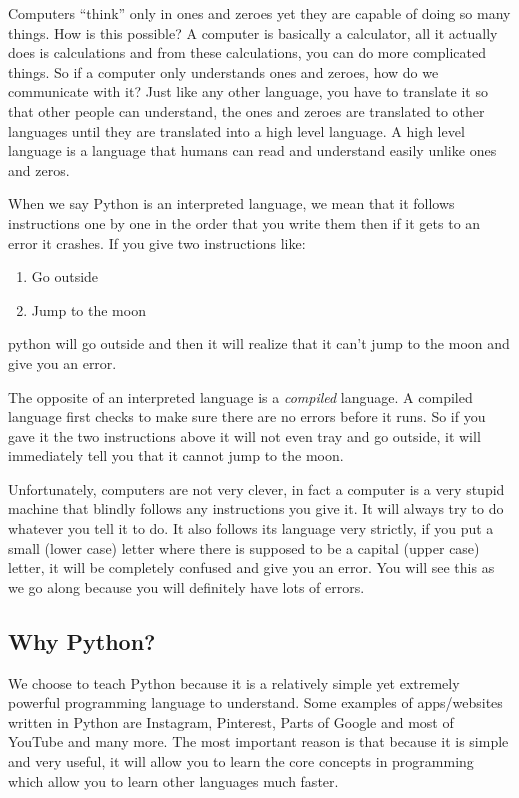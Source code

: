 Computers “think” only in ones and zeroes yet they are capable of doing so many things. How is this possible? A computer is basically a calculator, all it actually does is calculations and from these calculations, you can do more complicated things. So if a computer only understands ones and zeroes, how do we communicate with it? Just like any other language, you have to translate it so that other people can understand, the ones and zeroes are translated to other languages until they are translated into a high level language. A high level language is a language that humans can read and understand easily unlike ones and zeros.

When we say Python is an interpreted language, we mean that it follows instructions one by one in the order that you write them then if it gets to an error it crashes. If you give two instructions like:
\begin{enumerate}
\item Go outside
\item Jump to the moon
\end{enumerate}
python will go outside and then it will realize that it can’t jump to the moon and give you an error.

The opposite of an interpreted language is a \textit{compiled} language. A compiled language first checks to make sure there are no errors before it runs. So if you gave it the two instructions above it will not even tray and go outside, it will immediately tell you that it cannot jump to the moon.

Unfortunately, computers are not very clever, in fact a computer is a very stupid machine that
blindly follows any instructions you give it. It will always try to do whatever you tell it to do. It also
follows its language very strictly, if you put a small (lower case) letter where there is supposed to be a capital (upper case) letter, it will be completely confused and give you an error. You will see this as we go along because you will definitely have lots of errors.

\subsection{Why Python?}

We choose to teach Python because it is a relatively simple yet extremely powerful programming
language to understand. Some examples of apps/websites written in Python are Instagram,
Pinterest, Parts of Google and most of YouTube and many more. The most important reason is that because it is simple and very useful, it will allow you to learn the core concepts in programming which allow you to learn other languages much faster.


